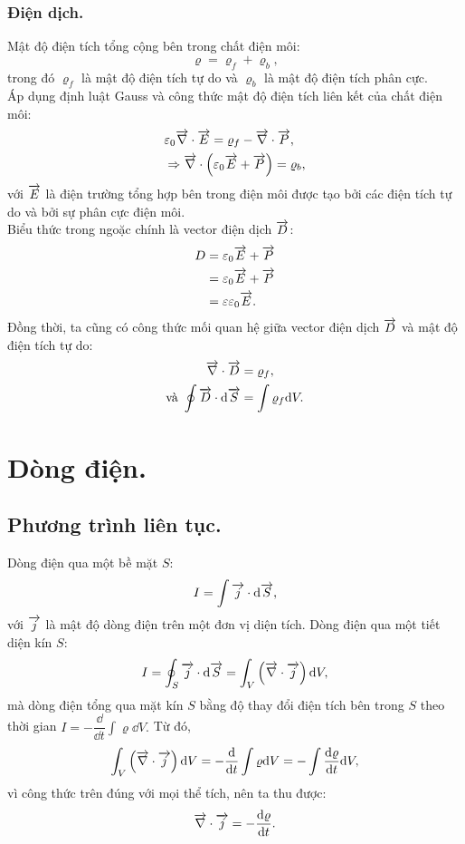 \begin{appendices}
\subsubsection{Điện dịch.}
    Mật độ điện tích tổng cộng bên trong chất điện môi:
    $$\varrho=\varrho_f+\varrho_b,$$
    trong đó $\varrho_f$ là mật độ điện tích tự do và $\varrho_b$ là mật độ điện tích phân cực.\\
    Áp dụng định luật Gauss và công thức mật độ điện tích liên kết của chất điện môi:
    \begin{align*}
    &\varepsilon_0\overrightarrow{\nabla}\cdot\overrightarrow{E}
    =\varrho_f-\overrightarrow{\nabla}\cdot\overrightarrow{P},\\
    &\Rightarrow \overrightarrow{\nabla}\cdot\left(\varepsilon_0\overrightarrow{E}+\overrightarrow{P}\right)=\varrho_b,
    \end{align*}
    với $\overrightarrow{E}$ là điện trường tổng hợp bên trong điện môi được tạo bởi các điện tích tự do và bởi sự phân cực điện môi.\\
    Biểu thức trong ngoặc chính là vector điện dịch $\overrightarrow{D}$:
    \begin{align*}
    {D}&=\varepsilon_0\overrightarrow{E}+\overrightarrow{P}\\
     &= 
      \varepsilon_0\overrightarrow{E}+\overrightarrow{P}  \\
     &=
      \varepsilon\varepsilon_0\overrightarrow{E}.
    \end{align*}
     Đồng thời, ta cũng có công thức mối quan hệ giữa vector điện dịch $\overrightarrow{D}$ và mật độ điện tích tự do:
     \begin{align*}
        \overrightarrow{\nabla}\cdot\overrightarrow{D}&=\varrho_f,\\
        \text{và } \oint\overrightarrow{D}\cdot\mathrm{d} \overrightarrow{S}&=\int\varrho_f\mathrm{d} V.
     \end{align*}
\section{Dòng điện.}
\subsection{Phương trình liên tục.}
    Dòng điện qua một bề mặt $S$: 
    $$I=\int\overrightarrow{j}\cdot\mathrm{d} \overrightarrow{S},$$
    với $\overrightarrow{j}$ là mật độ dòng điện trên một đơn vị diện tích.
    Dòng điện qua một tiết diện kín $S$:
    $$I=\oint_S\overrightarrow{j}\cdot\mathrm{d} \overrightarrow{S}=\int_V\left(\overrightarrow{\nabla}\cdot\overrightarrow{j}\right)\mathrm{d} V,$$
    mà dòng điện tổng qua mặt kín $S$ bằng độ thay đổi điện tích bên trong $S$ theo thời gian $I=-\dfrac{\dd}{\dd t}\int\varrho\dd V.$ Từ đó,\\
    \begin{align*}
            \int_V\left(\overrightarrow{\nabla}\cdot\overrightarrow{j}\right)\mathrm{d} V=-\dfrac{\mathrm{d}}{\mathrm{d} t}\int\varrho\mathrm{d} V=-\int\dfrac{\mathrm{d} \varrho}{\mathrm{d} t}\mathrm{d} V,
    \end{align*}
    vì công thức trên đúng với mọi thể tích, nên ta thu được:
    $$\overrightarrow{\nabla}\cdot\overrightarrow{j}=-\dfrac{\mathrm{d} \varrho}{\mathrm{d} t}.$$

\end{appendices}

